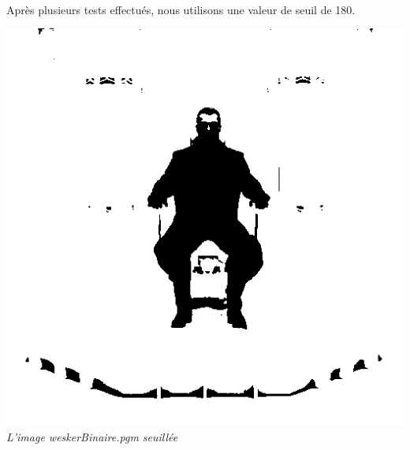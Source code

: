 \documentclass[a4paper,11pt]{article}
\begin{document}
\paragraph{} Après plusieurs tests effectués, nous utilisons une valeur de seuil de 180.
\begin{center}
\includegraphics[scale=0.7]{weskerbinaire.png}\\
\textit{L'image weskerBinaire.pgm seuillée}
\end{center}

\newpage
\end{document}

